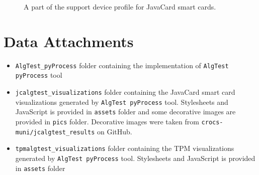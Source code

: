 \begin{figure}
    \centering
    
    \caption{A part of the support device profile for JavaCard smart cards.}
\end{figure}

\renewcommand{\thechapter}{D}
\chapter{Data Attachments}
\begin{itemize}
    \item \texttt{AlgTest\_pyProcess} folder containing the implementation of \texttt{AlgTest pyProcess} tool
    \item \texttt{jcalgtest\_visualizations} folder containing the JavaCard smart card visualizations generated by \texttt{AlgTest pyProcess} tool. Stylesheets and JavaScript is provided in \texttt{assets} folder and some decorative images are provided in \texttt{pics} folder. Decorative images were taken from \texttt{crocs-muni/jcalgtest\_results} on GitHub.
    
    \item \texttt{tpmalgtest\_visualizations} folder containing the TPM visualizations generated by \texttt{AlgTest pyProcess} tool. Stylesheets and JavaScript is provided in \texttt{assets} folder 
\end{itemize}
